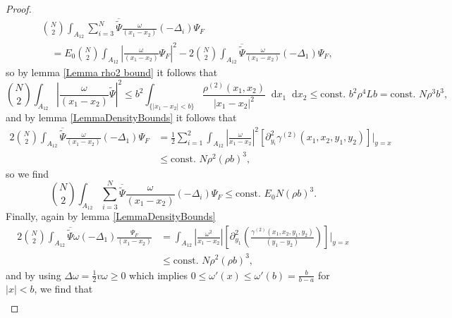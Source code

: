 \documentclass[a4paper,11pt]{article}
\newcommand{\abs}[1]{\left\lvert #1 \right\rvert}
\newcommand*\diff{\mathop{}\!\mathrm{d}}
\numberwithin{equation}{section}
\begin{document}
\begin{proof}
\begin{equation}
		\begin{aligned}
		&\binom{N}{2}\int_{A_{12}}\sum_{i=3}^{N} \overline{\tilde{\Psi}}\frac{\omega}{(x_1-x_2)}(-\Delta_i)\Psi_F\\&\quad=E_0\binom{N}{2}\int_{A_{12}}\left\lvert\frac{\omega}{(x_1-x_2)}\Psi_F\right\rvert^2-2\binom{N}{2}\int_{A_{12}} \overline{\tilde{\Psi}}\frac{\omega}{(x_1-x_2)}(-\Delta_1)\Psi_F,
		\end{aligned}
		\end{equation}
		so by lemma \ref{Lemma rho2 bound} it follows that
		\begin{equation}
		\binom{N}{2}\int_{A_{12}}\left\lvert\frac{\omega}{(x_1-x_2)}\tilde{\Psi}\right\rvert^2\leq b^2\int_{\{\abs{x_1-x_2}<b\}} \frac{\rho^{(2)}(x_1,x_2)}{\abs{x_1-x_2}^2}\diff x_1\diff x_2\leq  \text{const. } b^2\rho^4  L b=\text{const. }N\rho^3 b^3,
		\end{equation}
		and by lemma \ref{LemmaDensityBounds} it follows that \begin{equation}
		\begin{aligned}
		2\binom{N}{2}\int_{A_{12}} \overline{\tilde{\Psi}}\frac{\omega}{(x_1-x_2)}(-\Delta_1)\Psi_F&=\frac12\sum_{i=1}^{2}\int_{A_{12}}\abs{\frac{\omega}{x_1-x_2}}^2\left[\partial^2_{y_i}\gamma^{(2)}(x_1,x_2,y_1,y_2)\right]\Big\rvert_{y=x}\\&\leq \text{const. } N\rho^2(\rho b)^3,
		\end{aligned}
		\end{equation}
		so we find \begin{equation}
		\binom{N}{2}\int_{A_{12}}\sum_{i=3}^{N} \overline{\tilde{\Psi}}\frac{\omega}{(x_1-x_2)}(-\Delta_i)\Psi_F\leq \text{const. } E_0 N(\rho b)^3.
		\end{equation}
		Finally, again by lemma \ref{LemmaDensityBounds} \begin{equation}
		\begin{aligned}
		2\binom{N}{2}\int_{A_{12}}\overline{\tilde{\Psi}}\omega(-\Delta_1)\frac{\Psi_F}{(x_1-x_2)}&=\int_{A_{12}}\abs{\frac{\omega^2}{x_1-x_2}}\left[\partial^2_{y_1}\left(\frac{\gamma^{(2)}(x_1,x_2,y_1,y_2)}{(y_1-y_2)}\right)\right]\Big\rvert_{y=x}\\&\leq\text{const. }N\rho^2 (\rho b)^3,
		\end{aligned}
		\end{equation}
		and by using $ \Delta\omega=\frac{1}{2}v\omega\geq0 $ which implies $ 0\leq\omega'(x)\leq \omega'(b)=\frac{b}{b-a} $ for $ \abs{x}<b $, we find that \begin{equation}
		\begin{aligned}

\end{aligned}
\end{equation}
\end{proof}
\end{document}
